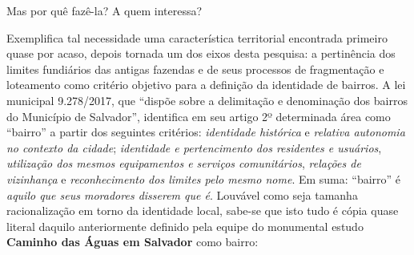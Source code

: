 Mas por quê fazê-la? A quem interessa? 

Exemplifica tal necessidade uma característica territorial encontrada primeiro quase por acaso, depois tornada um dos eixos desta pesquisa: a pertinência dos limites fundiários das antigas fazendas e de seus processos de fragmentação e loteamento como critério objetivo para a definição da identidade de bairros. A lei municipal 9.278/2017, que ``dispõe sobre a delimitação e denominação dos bairros do Município de Salvador'', identifica em seu artigo 2º determinada área como ``bairro'' a partir dos seguintes critérios: \textit{identidade histórica} e \textit{relativa autonomia no contexto da cidade}; \textit{identidade e pertencimento dos residentes e usuários}, \textit{utilização dos mesmos equipamentos e serviços comunitários}, \textit{relações de vizinhança} e \textit{reconhecimento dos limites pelo mesmo nome}. Em suma: ``bairro'' é \textit{aquilo que seus moradores disserem que é}. Louvável como seja tamanha racionalização em torno da identidade local, sabe-se que isto tudo é cópia quase literal daquilo anteriormente definido pela equipe do monumental estudo \textbf{Caminho das Águas em Salvador} como bairro:

